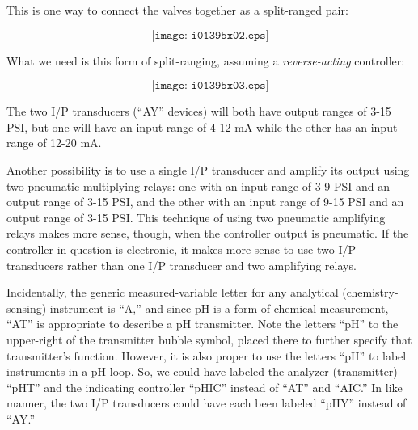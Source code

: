 





This is one way to connect the valves together as a split-ranged pair:

$$\texttt{[image: i01395x02.eps]}$$







What we need is this form of split-ranging, assuming a {\it reverse-acting} controller:

$$\texttt{[image: i01395x03.eps]}$$

The two I/P transducers (``AY'' devices) will both have output ranges of 3-15 PSI, but one will have an input range of 4-12 mA while the other has an input range of 12-20 mA.

\vskip 10pt

Another possibility is to use a single I/P transducer and amplify its output using two pneumatic multiplying relays: one with an input range of 3-9 PSI and an output range of 3-15 PSI, and the other with an input range of 9-15 PSI and an output range of 3-15 PSI.  This technique of using two pneumatic amplifying relays makes more sense, though, when the controller output is pneumatic.  If the controller in question is electronic, it makes more sense to use two I/P transducers rather than one I/P transducer and two amplifying relays.

Incidentally, the generic measured-variable letter for any analytical (chemistry-sensing) instrument is ``A,'' and since pH is a form of chemical measurement, ``AT'' is appropriate to describe a pH transmitter.  Note the letters ``pH'' to the upper-right of the transmitter bubble symbol, placed there to further specify that transmitter's function.  However, it is also proper to use the letters ``pH'' to label instruments in a pH loop.  So, we could have labeled the analyzer (transmitter) ``pHT'' and the indicating controller ``pHIC'' instead of ``AT'' and ``AIC.''  In like manner, the two I/P transducers could have each been labeled ``pHY'' instead of ``AY.''




